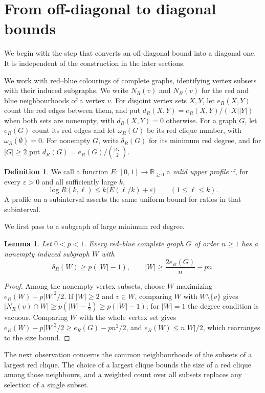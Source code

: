 \documentclass[11pt]{article}
\newtheorem{lemma}[theorem]{Lemma}
\theoremstyle{definition}
\newtheorem{definition}[theorem]{Definition}
\theoremstyle{remark}
\numberwithin{equation}{section}
\begin{document}
\section{From off-diagonal to diagonal bounds}\label{sec:completion}

We begin with the step that converts an off-diagonal bound into a
diagonal one. It is independent of the construction in the later
sections.

We work with red--blue colourings of complete graphs, identifying
vertex subsets with their induced subgraphs. We write $N_R(v)$ and
$N_B(v)$ for the red and blue neighbourhoods of a vertex $v$.
For disjoint vertex sets $X,Y$, let $e_R(X,Y)$ count the red edges
between them, and put $d_R(X,Y)=e_R(X,Y)/(|X||Y|)$ when both sets
are nonempty, with $d_R(X,Y)=0$ otherwise. For a graph $G$, let
$e_R(G)$ count its red edges and let $\omega_R(G)$ be its red clique
number, with $\omega_R(\emptyset)=0$. For nonempty $G$, write
$\delta_R(G)$ for its minimum red degree, and for $|G|\ge2$ put
$d_R(G)=e_R(G)/\binom{|G|}{2}$.

\begin{definition}\label{def:profile}
We call a function $E:[0,1]\to\mathbb R_{\ge0}$ a \emph{valid upper profile} if, for every $\varepsilon>0$ and all sufficiently large $k$,
\[
 \log R(k,\ell)\le k\bigl(E(\ell/k)+\varepsilon\bigr)
 \qquad(1\le\ell\le k).
\]
A profile on a subinterval asserts the same uniform bound for ratios
in that subinterval.
\end{definition}

We first pass to a subgraph of large minimum red degree.

\begin{lemma}\label{lem:core}
Let $0<p<1$. Every red--blue complete graph $G$ of order $n\ge1$ has a nonempty induced subgraph $W$ with
\[
 \delta_R(W)\ge p(|W|-1),\qquad
 |W|\ge\frac{2e_R(G)}{n}-pn.
\]
\end{lemma}
\begin{proof}
Among the nonempty vertex subsets, choose $W$ maximizing
$e_R(W)-p|W|^2/2$. If $|W|\ge2$ and $v\in W$, comparing $W$ with
$W\setminus\{v\}$ gives
$|N_R(v)\cap W|\ge p(|W|-\tfrac12)\ge p(|W|-1)$; for $|W|=1$ the degree
condition is vacuous. Comparing $W$ with the whole vertex set gives
$e_R(W)-p|W|^2/2\ge e_R(G)-pn^2/2$, and $e_R(W)\le n|W|/2$, which
rearranges to the size bound.
\end{proof}

The next observation concerns the common neighbourhoods of the subsets
of a largest red clique. The choice of a largest clique bounds the size
of a red clique among those neighbours, and a weighted count over all
subsets replaces any selection of a single subset.
\end{document}
